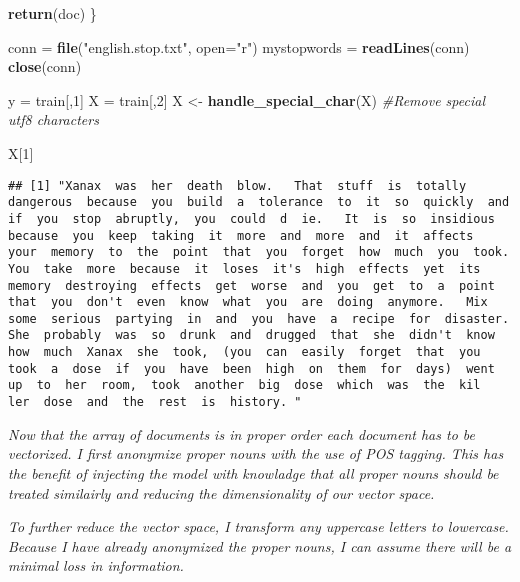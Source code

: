 \documentclass[]{article}
\newenvironment{Shaded}{\begin{snugshade}}{\end{snugshade}}
\newcommand{\CommentTok}[1]{\textcolor[rgb]{0.56,0.35,0.01}{\textit{#1}}}
\newcommand{\DataTypeTok}[1]{\textcolor[rgb]{0.13,0.29,0.53}{#1}}
\newcommand{\DecValTok}[1]{\textcolor[rgb]{0.00,0.00,0.81}{#1}}
\newcommand{\KeywordTok}[1]{\textcolor[rgb]{0.13,0.29,0.53}{\textbf{#1}}}
\newcommand{\NormalTok}[1]{#1}
\newcommand{\StringTok}[1]{\textcolor[rgb]{0.31,0.60,0.02}{#1}}
\begin{document}
\begin{Shaded}
\begin{Highlighting}[]
  \KeywordTok{return}\NormalTok{(doc)}
\NormalTok{\}}

\NormalTok{conn =}\StringTok{ }\KeywordTok{file}\NormalTok{(}\StringTok{"english.stop.txt"}\NormalTok{, }\DataTypeTok{open=}\StringTok{"r"}\NormalTok{)}
\NormalTok{mystopwords =}\StringTok{ }\KeywordTok{readLines}\NormalTok{(conn)}
\KeywordTok{close}\NormalTok{(conn)}

\NormalTok{y =}\StringTok{ }\NormalTok{train[,}\DecValTok{1}\NormalTok{]}
\NormalTok{X =}\StringTok{ }\NormalTok{train[,}\DecValTok{2}\NormalTok{]}
\NormalTok{X <-}\StringTok{ }\KeywordTok{handle_special_char}\NormalTok{(X) }\CommentTok{#Remove special utf8 characters}

\NormalTok{X[}\DecValTok{1}\NormalTok{]}
\end{Highlighting}
\end{Shaded}

\begin{verbatim}
## [1] "Xanax  was  her  death  blow.   That  stuff  is  totally  dangerous  because  you  build  a  tolerance  to  it  so  quickly  and  if  you  stop  abruptly,  you  could  d  ie.   It  is  so  insidious  because  you  keep  taking  it  more  and  more  and  it  affects  your  memory  to  the  point  that  you  forget  how  much  you  took.   You  take  more  because  it  loses  it's  high  effects  yet  its  memory  destroying  effects  get  worse  and  you  get  to  a  point  that  you  don't  even  know  what  you  are  doing  anymore.   Mix  some  serious  partying  in  and  you  have  a  recipe  for  disaster.   She  probably  was  so  drunk  and  drugged  that  she  didn't  know  how  much  Xanax  she  took,  (you  can  easily  forget  that  you  took  a  dose  if  you  have  been  high  on  them  for  days)  went  up  to  her  room,  took  another  big  dose  which  was  the  kil  ler  dose  and  the  rest  is  history. "
\end{verbatim}

\emph{Now that the array of documents is in proper order each document
has to be vectorized. I first anonymize proper nouns with the use of POS
tagging. This has the benefit of injecting the model with knowladge that
all proper nouns should be treated similairly and reducing the
dimensionality of our vector space.}

\emph{To further reduce the vector space, I transform any uppercase
letters to lowercase. Because I have already anonymized the proper
nouns, I can assume there will be a minimal loss in information.}
\end{document}
